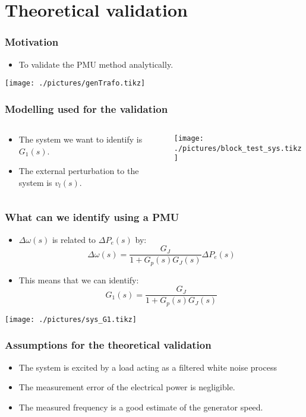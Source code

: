 \section{Theoretical validation}
\begin{frame}
	\frametitle{Motivation}
	\begin{itemize}
		\item To validate the PMU method analytically.
	\end{itemize}
	\texttt{[image: ./pictures/genTrafo.tikz]}
\end{frame}
\begin{frame}
	\frametitle{Modelling used for the validation}
	\begin{columns}
		\begin{column}{0.3\textwidth}
			\begin{itemize}
				\item The system we want to identify is $G_1(s)$.
				\item The external perturbation to the system is $v_l(s)$.
			\end{itemize}
		\end{column}
		\begin{column}{0.7\textwidth}
			\texttt{[image: ./pictures/block\_test\_sys.tikz]}
		\end{column}
	\end{columns}
\end{frame}
\begin{frame}
	\frametitle{What can we identify using a PMU}
	\begin{itemize}
		\item $\Delta \omega(s)$ is related to $\Delta P_e(s)$ by:
	\begin{equation*}
		\Delta \omega(s) = \frac{G_{J}}{1+G_p(s)G_J(s)}\Delta P_e(s)
	\end{equation*}
	\item This means that we can identify:
		\begin{equation*}
			G_1(s) = \frac{G_{J}}{1+G_p(s)G_J(s)}
		\end{equation*}
	\end{itemize}
		\texttt{[image: ./pictures/sys\_G1.tikz]}
\end{frame}
\begin{frame}
	\frametitle{Assumptions for the theoretical validation}
		\begin{itemize}
			\item The system is excited by a load acting as a filtered white noise process
			\item The measurement error of the electrical power is negligible.
			\item The measured frequency is a good estimate of the generator speed.
		\end{itemize}
\end{frame}
